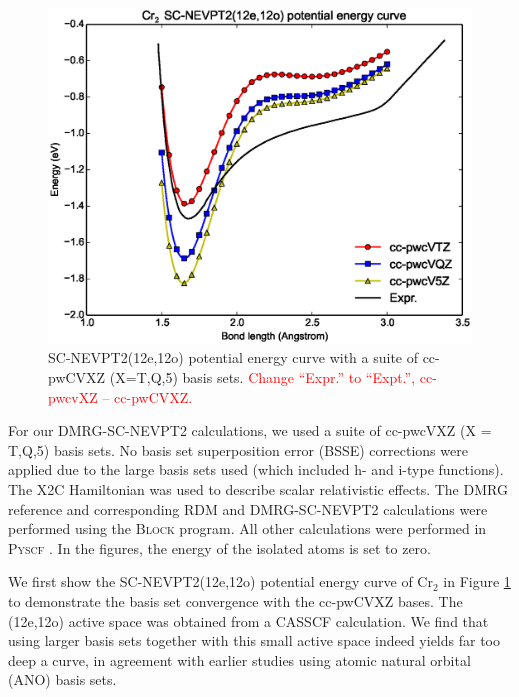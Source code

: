 \begin{figure}
  \includegraphics[width=1.1\columnwidth]{Cr2-nevpt2.eps}
  \caption{SC-NEVPT2(12e,12o) potential energy curve with a suite of cc-pwCVXZ (X=T,Q,5) basis sets. \textcolor{red}{Change ``Expr.'' to ``Expt.'',
  cc-pwcvXZ -- cc-pwCVXZ.}}
  \label{fig:12o_nevpt2}
\end{figure}

For our DMRG-SC-NEVPT2 calculations, we used a suite of cc-pwcVXZ (X = T,Q,5) basis sets. No basis set superposition error (BSSE) corrections were applied 
due to the large basis sets used (which included h- and i-type functions). The X2C Hamiltonian was used to describe scalar relativistic effects. 
The DMRG reference and corresponding RDM and DMRG-SC-NEVPT2 calculations were performed using the \textsc{Block} program\cite{sharma_spin-adapted_2012}. 
All other calculations were performed in \textsc{Pyscf} \cite{sun_pyscf}. In the figures, the energy of the isolated atoms is set to zero.

We first show the SC-NEVPT2(12e,12o) potential energy curve of Cr$_2$ in Figure \ref{fig:12o_nevpt2} 
to demonstrate the basis set convergence with the cc-pwCVXZ bases. The (12e,12o) active space was obtained from a CASSCF calculation. We find that
using larger basis sets together with this small active space indeed yields far too deep a curve, in agreement with earlier studies  using atomic natural orbital (ANO) basis sets.\cite{angeli_third-order_2006}

